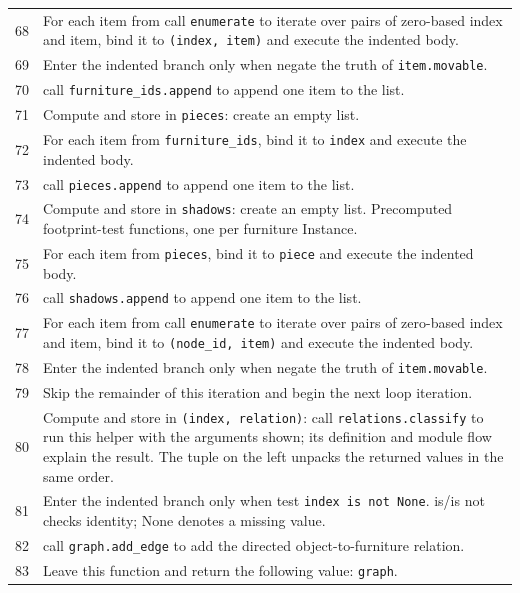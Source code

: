 \documentclass[11pt,a4paper]{book}
\begin{document}
\begin{longtable}{r p{}}
68 & For each item from call \texttt{enumerate} to iterate over pairs of zero-based index and item, bind it to \texttt{(index, item)} and execute the indented body. \\

69 & Enter the indented branch only when negate the truth of \texttt{item.movable}. \\

70 & call \texttt{furniture\_ids.append} to append one item to the list. \\

71 & Compute and store in \texttt{pieces}: create an empty list.  \\

72 & For each item from \texttt{furniture\_ids}, bind it to \texttt{index} and execute the indented body. \\

73 & call \texttt{pieces.append} to append one item to the list. \\

74 & Compute and store in \texttt{shadows}: create an empty list. Precomputed footprint-test functions, one per furniture Instance. \\

75 & For each item from \texttt{pieces}, bind it to \texttt{piece} and execute the indented body. \\

76 & call \texttt{shadows.append} to append one item to the list. \\

77 & For each item from call \texttt{enumerate} to iterate over pairs of zero-based index and item, bind it to \texttt{(node\_id, item)} and execute the indented body. \\

78 & Enter the indented branch only when negate the truth of \texttt{item.movable}. \\

79 & Skip the remainder of this iteration and begin the next loop iteration. \\

80 & Compute and store in \texttt{(index, relation)}: call \texttt{relations.classify} to run this helper with the arguments shown; its definition and module flow explain the result. The tuple on the left unpacks the returned values in the same order. \\

81 & Enter the indented branch only when test \texttt{index is not None}. is/is not checks identity; None denotes a missing value. \\

82 & call \texttt{graph.add\_edge} to add the directed object-to-furniture relation. \\

83 & Leave this function and return the following value: \texttt{graph}. \\

\end{longtable}
\end{document}
